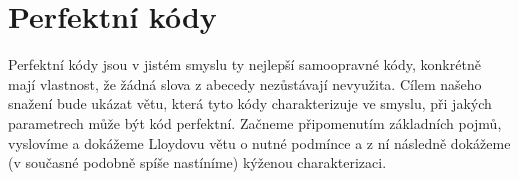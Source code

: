 \documentclass[a4paper,12pt,titlepage]{article}
\begin{document}
\section{Perfektní kódy}

Perfektní kódy jsou v jistém smyslu ty nejlepší samoopravné kódy, konkrétně mají vlastnost, že žádná slova z abecedy nezůstávají nevyužita. Cílem našeho snažení bude ukázat větu, která tyto kódy charakterizuje ve smyslu, při jakých parametrech může být kód perfektní. Začneme připomenutím základních pojmů, vyslovíme a dokážeme Lloydovu větu o nutné podmínce a z ní následně dokážeme (v současné podobně spíše nastíníme) kýženou charakterizaci.








\end{document}
